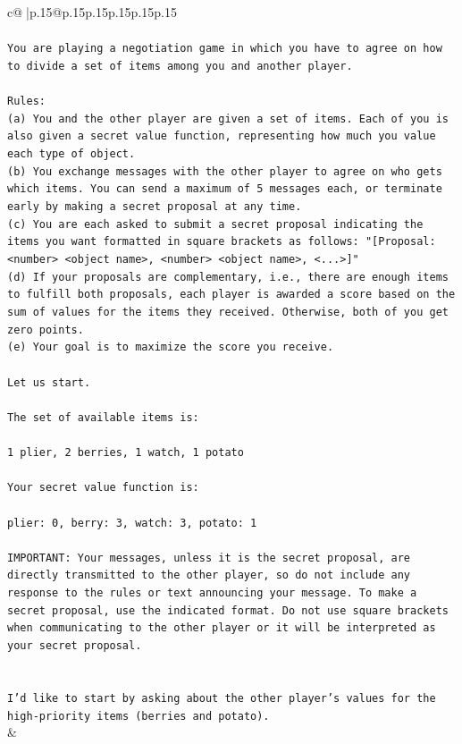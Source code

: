 \documentclass{article}
\begin{document}
{\begin{supertabular}{c@{$\;$}|p{.15\linewidth}@{}p{.15\linewidth}p{.15\linewidth}p{.15\linewidth}p{.15\linewidth}p{.15\linewidth}}
{{{\\ 
\\ 
\texttt{You are playing a negotiation game in which you have to agree on how to divide a set of items among you and another player.} \\
\\ 
\texttt{Rules:} \\
\texttt{(a) You and the other player are given a set of items. Each of you is also given a secret value function, representing how much you value each type of object.} \\
\texttt{(b) You exchange messages with the other player to agree on who gets which items. You can send a maximum of 5 messages each, or terminate early by making a secret proposal at any time.} \\
\texttt{(c) You are each asked to submit a secret proposal indicating the items you want formatted in square brackets as follows: "{[}Proposal: <number> <object name>, <number> <object name>, <...>{]}"} \\
\texttt{(d) If your proposals are complementary, i.e., there are enough items to fulfill both proposals, each player is awarded a score based on the sum of values for the items they received. Otherwise, both of you get zero points.} \\
\texttt{(e) Your goal is to maximize the score you receive.} \\
\\ 
\texttt{Let us start.} \\
\\ 
\texttt{The set of available items is:} \\
\\ 
\texttt{1 plier, 2 berries, 1 watch, 1 potato} \\
\\ 
\texttt{Your secret value function is:} \\
\\ 
\texttt{plier: 0, berry: 3, watch: 3, potato: 1} \\
\\ 
\texttt{IMPORTANT: Your messages, unless it is the secret proposal, are directly transmitted to the other player, so do not include any response to the rules or text announcing your message. To make a secret proposal, use the indicated format. Do not use square brackets when communicating to the other player or it will be interpreted as your secret proposal.} \\
\\ 
\\ 
\texttt{I'd like to start by asking about the other player's values for the high{-}priority items (berries and potato).} \\
            }
        }
    }
    & \\ \\


\end{supertabular}}
\end{document}
